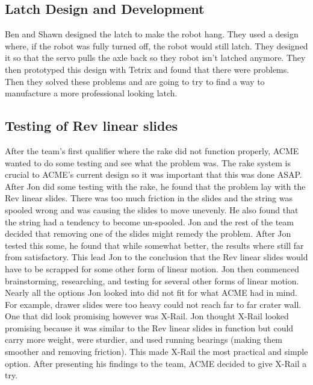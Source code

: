 \documentclass{article}
\begin{document}
\subsection{Latch Design and Development}
Ben and Shawn designed the latch to make the robot hang. They used a design where, if the robot was fully turned off, the robot would still latch. They designed it so that the servo pulls the axle back so they robot isn't latched anymore. They then prototyped this design with Tetrix and found that there were problems. Then they solved these problems and are going to try to find a way to manufacture a more professional looking latch.

\subsection{Testing of Rev linear slides}
After the team's first qualifier where the rake did not function properly, ACME wanted to do some testing and see what the problem was. The rake system is crucial to ACME's current design so it was important that this was done ASAP. After Jon did some testing with the rake, he found that the problem lay with the Rev linear slides. There was too much friction in the slides and the string was spooled wrong and was causing the slides to move unevenly. He also found that the string had a tendency to become un-spooled. Jon and the rest of the team decided that removing one of the slides might remedy the problem. After Jon tested this some, he found that while somewhat better, the results where still far from satisfactory. This lead Jon to the conclusion that the Rev linear slides would have to be scrapped for some other form of linear motion. Jon then commenced brainstorming, researching, and testing for several other forms of linear motion. Nearly all the options Jon looked into did not fit for what ACME had in mind. For example, drawer slides were too heavy could not reach far to far crater wall. One that did look promising however was X-Rail. Jon thought X-Rail looked promising because it was similar to the Rev linear slides in function but could carry more weight, were sturdier, and used running bearings (making them smoother and removing friction). This made X-Rail the most practical and simple option. After presenting his findings to the team, ACME decided to give X-Rail a try. 
\end{document}

